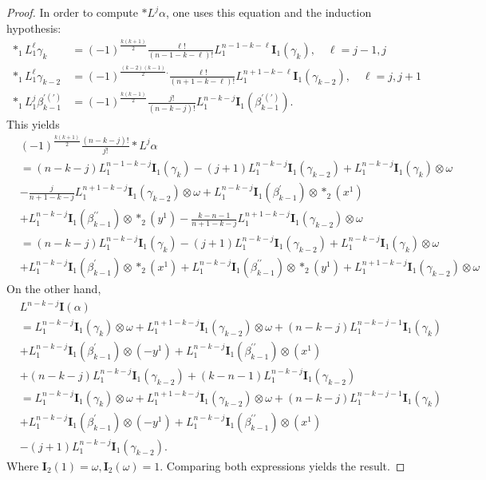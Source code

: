 \begin{proof}
In order to compute $* L^j \alpha$, one uses this equation and the induction hypothesis:
$$
\begin{aligned}
*_1 L_1^{\ell} \gamma_k & =(-1)^{\frac{k(k+1)}{2}} \frac{\ell !}{(n-1-k-\ell) !} L_1^{n-1-k-\ell} \mathbf{I}_1\left(\gamma_k\right), \quad \ell=j-1, j \\
*_1 L_1^{\ell} \gamma_{k-2} & =(-1)^{\frac{(k-2)(k-1)}{2} .} \frac{\ell !}{(n+1-k-\ell) !} L_1^{n+1-k-\ell} \mathbf{I}_1\left(\gamma_{k-2}\right), \quad \ell=j, j+1 \\
*_1  L_1^j \beta_{k-1}^{\prime(\prime)} & =(-1)^{\frac{k(k-1)}{2}} \frac{j !}{(n-k-j) !} L_1^{n-k-j} \mathbf{I}_1\left(\beta_{k-1}^{\prime(\prime)}\right) .
\end{aligned}
$$
This yields
$$
\begin{aligned}
& (-1)^{\frac{k(k+1)}{2}} \frac{(n-k-j) !}{j !} * L^j \alpha \\
&=(n-k-j)L_1^{n-1-k-j} \mathbf{I}_1(\gamma_k)-(j+1)L_1^{n-k-j}\mathbf{I}_1(\gamma_{k-2})+L_1^{n-k-j}\mathbf{I}_1(\gamma_{k})\otimes \omega\\ 
&-\frac{j}{n+1-k-j}L_1^{n+1-k-j}\mathbf{I}_1(\gamma_{k-2})\otimes\omega+L_1^{n-k-j}\mathbf{I}_1(\beta_{k-1}^\prime)\otimes *_2 (x^1)\\
&+L_1^{n-k-j}\mathbf{I}_1(\beta_{k-1}^{\prime\prime})\otimes *_2(y^1)-\frac{k-n-1}{n+1-k-j}L_1^{n+1-k-j}\mathbf{I}_1(\gamma_{k-2})\otimes\omega\\ 
&=(n-k-j)L_1^{n-k-j}\mathbf{I}_1(\gamma_k)-(j+1)L_1^{n-k-j}\mathbf{I}_1(\gamma_{k-2})+L_1^{n-k-j}\mathbf{I}_1(\gamma_k)\otimes\omega\\ 
&+L_1^{n-k-j}\mathbf{I}_1(\beta_{k-1}^\prime)\otimes*_2(x^1)+L_1^{n-k-j}\mathbf{I}_1(\beta_{k-1}^{\prime\prime})\otimes*_2(y^1)+L_1^{n+1-k-j}\mathbf{I}_1(\gamma_{k-2})\otimes\omega
\end{aligned}
$$
On the other hand,
$$
\begin{aligned}
&L^{n-k-j} \mathbf{I}(\alpha)\\
& =  L_1^{n-k-j}\mathbf{I}_1(\gamma_k)\otimes\omega +L_1^{n+1-k-j}\mathbf{I}_1(\gamma_{k-2})\otimes\omega+(n-k-j)L_1^{n-k-j-1}\mathbf{I}_1(\gamma_k)\\
&+L_1^{n-k-j}\mathbf{I}_1(\beta_{k-1}^\prime)\otimes(-y^1)+L_1^{n-k-j}\mathbf{I}_1(\beta_{k-1}^{\prime\prime})\otimes(x^1)\\ 
&+(n-k-j)L_1^{n-k-j}\mathbf{I}_1(\gamma_{k-2})+(k-n-1)L_1^{n-k-j}\mathbf{I}_1(\gamma_{k-2})\\ 
&=L_1^{n-k-j}\mathbf{I}_1(\gamma_k)\otimes\omega+L_1^{n+1-k-j}\mathbf{I}_1(\gamma_{k-2})\otimes\omega+(n-k-j)L_1^{n-k-j-1}\mathbf{I}_1(\gamma_k)\\
&+L_1^{n-k-j}\mathbf{I}_1(\beta_{k-1}^\prime)\otimes(-y^1)+L_1^{n-k-j}\mathbf{I}_1(\beta_{k-1}^{\prime\prime})\otimes(x^1)\\ 
&-(j+1)L_1^{n-k-j}\mathbf{I}_1(\gamma_{k-2}).
\end{aligned}
$$
Where $\mathbf{I}_2(1)=\omega,\mathbf{I}_2(\omega)=1$.
Comparing both expressions yields the result.
\end{proof}
